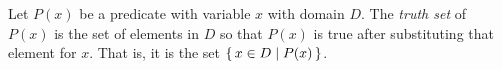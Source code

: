 \guard



\begin{defn}
\label{defn:truthSet}
  Let $P(x)$ be a predicate with variable $x$ with domain $D$.
  The \emph{truth set} of $P(x)$ is the set of elements in $D$ so that $P(x)$ is true after substituting that element for $x$.
  That is, it is the set $\left\{\, x \in D\mid P(x) \,\right\}$.
\end{defn}
